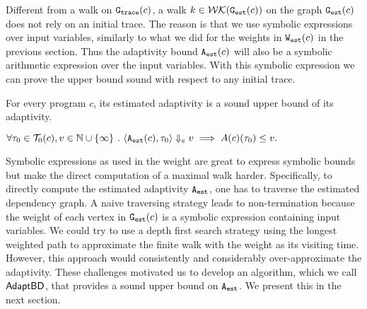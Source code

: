 

Different from a walk on $\mathtt{{G_{trace}}}(c)$, a walk $k \in \mathcal{WK}(\mathtt{{G_{est}}}(c))$ on the graph $\mathtt{{G_{est}}}(c)$
 does not rely on an initial trace. 
 The reason is that we use symbolic expressions over input variables, similarly to what we did for the weights in $\mathtt{{W_{est}}}(c)$ in the previous section. Thus the adaptivity bound ${\mathtt{A_{est}}}(c)$ will also be a symbolic arithmetic expression over the input variables. With this symbolic expression we can prove the upper bound sound with respect to any initial trace. 

%
\begin{thm}
    \label{thm:sound_progadapt}
    For every program $c$, 
    its estimated adaptivity is a sound upper bound of its adaptivity.
\begin{center}
$
     \forall \mathtt{\tau}_0 \in \mathcal{T}_{0}(c), v \in \mathbb{N}\cup \{\infty\} ~.~ 
\langle {\ensuremath{\mathtt{A_{est}}}}(c), \mathtt{\tau}_0 \rangle \Downarrow_e v \implies A(c)(\mathtt{\tau}_0) \leq v.
$
\end{center}
\end{thm}

Symbolic expressions as used in the weight are great to express symbolic bounds but make the direct computation of 
a maximal walk harder. Specifically, to directly compute the estimated adaptivity ${\mathtt{A_{est}}}$,
one has to traverse the estimated dependency graph.
A naive traversing strategy leads to non-termination
because the weight of each vertex in $\mathtt{{G_{est}}}({c})$
is a symbolic expression containing input variables.
We could try to use a depth first search strategy
using the longest weighted path to approximate
the finite walk with the weight as
its visiting time. However, this approach would  consistently and considerably over-approximate the adaptivity. These challenges 
motivated us to develop an algorithm, which we call  $\mathsf{AdaptBD}$,  that provides a sound upper bound 
on ${\mathtt{A_{est}}}$. We present this in the next section.


